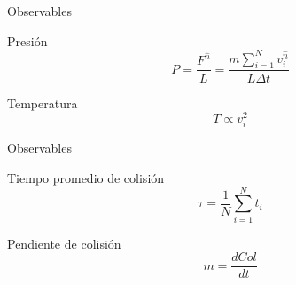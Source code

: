 \begin{frame}{Observables}
    \begin{block}{Presión}
        \begin{equation*}
            P = \frac{F^{\hat{n}}}{L} = \frac{m \sum_{i=1}^{N} v_{i}^{\hat{n}}}{L \Delta t}
        \end{equation*}
    \end{block}

    \begin{block}{Temperatura}
        \begin{equation*}
            T \propto v_{i}^{2}
        \end{equation*}
    \end{block}
\end{frame}

\begin{frame}{Observables}
    \begin{block}{Tiempo promedio de colisión}
        \begin{equation*}
            \tau = \frac{1}{N} \sum_{i=1}^{N} t_i
        \end{equation*}
    \end{block}

    \begin{block}{Pendiente de colisión}
        \begin{equation*}
            m = \frac{dCol}{dt}
        \end{equation*}
    \end{block}
\end{frame}


